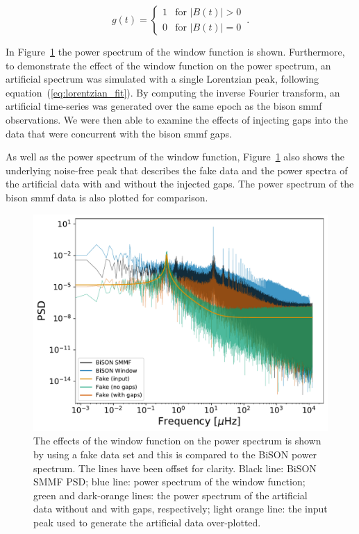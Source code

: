 \begin{equation}
g(t) = 
\begin{cases} 
1 & \text{for } |B(t)| > 0 \\
0       & \text{for } |B(t)| = 0
\end{cases} \, .
\label{eq:window}
\end{equation}

In Figure~\ref{fig:window_function_PSDs} the power spectrum of the window function is shown. Furthermore, to demonstrate the effect of the window function on the power spectrum, an artificial spectrum was simulated with a single Lorentzian peak, following equation~(\ref{eq:lorentzian_fit}). By computing the inverse Fourier transform, an artificial time-series was generated over the same epoch as the \gls{bison} \gls{smmf} observations. We were then able to examine the effects of injecting gaps into the data that were concurrent with the \gls{bison} \gls{smmf} gaps. 

As well as the power spectrum of the window function, Figure~\ref{fig:window_function_PSDs} also shows the underlying noise-free peak that describes the fake data and the power spectra of the artificial data with and without the injected gaps. The power spectrum of the \gls{bison} \gls{smmf} data is also plotted for comparison.

\begin{figure}[ht!]
	\centering
	\includegraphics[width=\columnwidth]{gap_test.pdf}
	\caption{The effects of the window function on the power spectrum is shown by using a fake data set and this is compared to the BiSON power spectrum. The lines have been offset for clarity. Black line: BiSON SMMF PSD; blue line: power spectrum of the window function; green and dark-orange lines: the power spectrum of the artificial data without and with gaps, respectively; light orange line: the input peak used to generate the artificial data over-plotted.}
	\label{fig:window_function_PSDs}
\end{figure}


